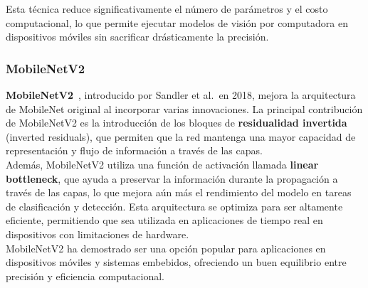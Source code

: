 Esta técnica reduce significativamente el número de parámetros y el costo computacional, lo que permite ejecutar
modelos de visión por computadora en dispositivos móviles sin sacrificar drásticamente la precisión.

\subsubsection{MobileNetV2}\label{subsubsec:mobilenetv2}
\textbf{MobileNetV2}~\cite{}, introducido por Sandler et al.\ en 2018, mejora la arquitectura de MobileNet original al
incorporar varias innovaciones.
La principal contribución de MobileNetV2 es la introducción de los bloques de \textbf{residualidad invertida} (inverted
residuals), que permiten que la red mantenga una mayor capacidad de representación y flujo de información a través de
las capas. \\[6pt]

Además, MobileNetV2 utiliza una función de activación llamada \textbf{linear bottleneck}, que ayuda a preservar la
información durante la propagación a través de las capas, lo que mejora aún más el rendimiento del modelo en tareas de
clasificación y detección.
Esta arquitectura se optimiza para ser altamente eficiente, permitiendo que sea utilizada en aplicaciones de tiempo
real en dispositivos con limitaciones de hardware. \\[6pt]

MobileNetV2 ha demostrado ser una opción popular para aplicaciones en dispositivos móviles y sistemas embebidos,
ofreciendo un buen equilibrio entre precisión y eficiencia computacional.
